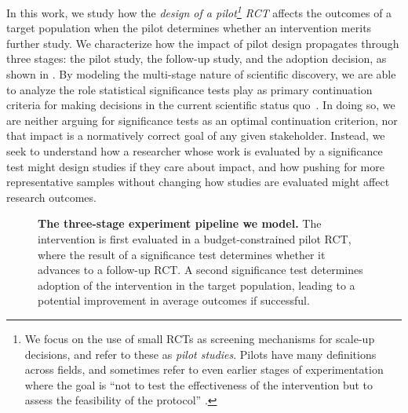 In this work, we study how the \emph{design of a pilot\footnote{We focus on the use of small RCTs as screening mechanisms for scale-up decisions, and refer to these as \emph{pilot studies}.
Pilots have many definitions across fields, and sometimes refer to even earlier stages of experimentation where the goal is ``not to test the effectiveness of the intervention but to assess the feasibility of the protocol'' \cite[Figure 2]{EldridgeLa16}.} RCT} affects the outcomes of a target population when the pilot determines whether an intervention merits further study.
We characterize how the impact of pilot design propagates through three stages: the pilot study, the follow-up study, and the adoption decision, as shown in .
By modeling the multi-stage nature of scientific discovery, we are able to analyze the role statistical significance tests play as primary continuation criteria for making decisions in the current scientific status quo~\cite{FDA19,Berry91}.
In doing so, we are neither arguing for significance tests as an optimal continuation criterion, nor that impact is a normatively correct goal of any given stakeholder.
Instead, we seek to understand how a researcher whose work is evaluated by a significance test might design studies if they care about impact, and how pushing for more representative samples without changing how studies are evaluated might affect research outcomes.

\begin{figure}[ht]
  \centering
  \vspace{0.8\baselineskip}
  
  \caption{
    \textbf{The three-stage experiment pipeline we model.}
    The intervention is first evaluated in a budget-constrained pilot RCT, where the result of a significance test determines whether it advances to a follow-up RCT.
    A second significance test determines adoption of the intervention in the target population, leading to a potential improvement in average outcomes if successful.
  }
  \label{fig:exp_process_flow}
\end{figure}

